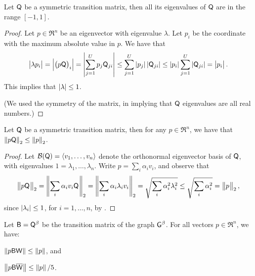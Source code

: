 \begin{lemma}
    Let $\mathsf{Q}$ be a symmetric transition matrix, then all its
    eigenvalues of $\mathsf{Q}$ are in the range $[-1,1]$.
\end{lemma}

\begin{proof}
    Let $p \in \Re^n$ be an eigenvector with eigenvalue $\lambda$. Let
    $p_i$ be the coordinate with the maximum absolute value in $p$. We
    have that
    \begin{equation*}
        \cardin{\bigl.\lambda p_i}%
        =%
        \cardin{\Bigl.\pth[]{\bigl. p\TMtrx}_i}%
        =%
        \cardin{\sum_{j=1}^U p_j \TMtrx_{ji} }%
        \leq%
        \sum_{j=1}^U \cardin{p_j} \cardin{ \TMtrx_{ji} }%
        \leq%
        \cardin{p_i} \sum_{j=1}^U \cardin{ \TMtrx_{ji} }%
        =%
        \cardin{\bigl. p_i}.
    \end{equation*}
    This implies that $\left| {\lambda} \right| \leq 1$.
    
    (We used the symmetry of the matrix, in implying that $\mathsf{Q}$
    eigenvalues are all real numbers.)
\end{proof}

\begin{lemma}
    Let $\mathsf{Q}$ be a symmetric transition matrix, then for any $p \in
    \Re^n$, we have that $\left\| {p \mathsf{Q}} \right\|_2 \leq \left\| { p } \right\|_2$.
\end{lemma}

\begin{proof}
    Let $\mathcal{B}(\mathsf{Q})= \left\langle {v_1,\ldots, v_n} \right\rangle$ denote the
    orthonormal eigenvector basis of $\mathsf{Q}$, with eigenvalues
    $1=\lambda_1, \ldots, \lambda_n$. Write $p = \sum_i \alpha_i v_i$,
    and observe that
    \begin{equation*}
        \norm{ \bigl. p \TMtrx \ts}_2%
        =%
        \norm{\sum_i \alpha_i v_i \TMtrx \ts}_2%
        =%
        \norm{\sum_i \alpha_i \lambda_i v_i }_2%
        =%
        \sqrt{\sum_i \alpha_i^2 \lambda_i^2}%
        \leq %
        \sqrt{\sum_i \alpha_i^2 }%
        =%
        \norm{\bigl.p \ts}_2,
    \end{equation*}
    since $\left| {\lambda_i} \right| \leq 1$, for $i=1,\ldots, n$, by
    .
\end{proof}


\begin{lemma}
    Let $\mathsf{B}= \mathsf{Q}^\beta$ be the transition matrix of the graph
    $\mathsf{G}^\beta$.  For all vectors $p \in \Re^n$, we have:
    \begin{compactenumi}
        \item
        $\left\| { p \mathsf{B} \mathsf{W}} \right\| \leq \left\| {p} \right\|$, and
        \smallskip%
        \item
        $\left\| {\bigl. p \smash{\mathsf{B} \overline{\mathsf{W}} } } \right\| \leq \left\| {p} \right\|/5$.
    \end{compactenumi}
\end{lemma}

